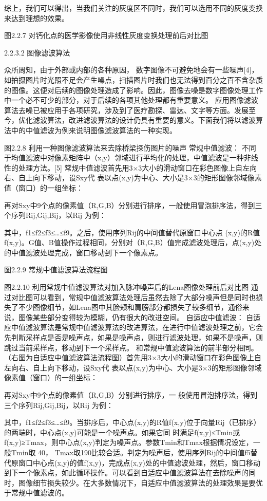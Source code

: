 	综上，我们可以得出，当我们关注的灰度区不同时，我们可以选用不同的灰度变换来达到理想的效果。

图2.2.7 对钙化点的医学影像使用非线性灰度变换处理前后对比图

2.2.3.2 图像滤波算法

众所周知，由于外部或内部的各种原因， 数字图像不可避免地会有一些噪声[4]，如拍摄图片时光照不足会产生噪点，扫描图片时我们也无法得到百分之百不含杂质的图像。这便对后续的图像处理造成了影响。因此，图像去噪是数字图像处理工作中一个必不可少的部分，对于后续的各项其他处理都有重要意义。 应用图像滤波算法去噪已被应用于各项研究，涉及到了医疗勘探、雷达、文字等方面。发展至今，优化滤波算法，改进滤波算法的设计仍具有重要的意义。下面我们将以滤波算法中的中值滤波为例来说明图像滤波算法的一种实现。

图2.2.8 利用一种图像滤波算法来去除桥梁探伤图片的噪声
常规中值滤波：
不同于均值滤波中对像素矩阵中（x,y）邻域进行平均化的处理，中值滤波是一种非线性的处理方法。[5]
	  常规中值滤波首先用3×3大小的滑动窗口在彩色图像上自左向右、自上向下移动，设Sxy代 表以点(x,y)为中心、大小是3×3的矩形图像邻域像素值（窗口）的一组坐标：

再对Sxy中9个点的像素值（R,G,B）分别进行排序，一般使用冒泡排序法，得到三个序列Rij,Gij,Bij，以Rij 为例：

其中，f1≤f2≤f3≤…≤f9。之后，使用序列Rij的中间值替代原窗口中心点 (x,y)的R值f(x,y)。G值、B值操作过程相同，分别对（R,G,B）值完成滤波处理后，点(x,y)处的中值滤波处理完成，窗口移动到下一个像素点。

图2.2.9 常规中值滤波算法流程图

图2.2.10 利用常规中值滤波算法对加入脉冲噪声后的Lena图像处理前后对比图
通过对比图可以看到，常规中值滤波算法处理后虽然去除了大部分噪声但是同时也损失了不少图像细节，如Lena图中其脸颊和肩膀部分都损失了较多细节，通俗来说，图像某些部分变得较为模糊，仍有很大的改进空间。
自适应中值滤波：
自适应中值滤波算法是常规中值滤波算法的改进算法，在进行中值滤波处理之前，它会先判断采样点是否是噪声点，如果是噪声点，则进行滤波处理，如果不是噪声，则跳过当前采样点，移动到下一个采样点。
	和常规中值滤波算法的前半部分相同。（右图为自适应中值滤波算法流程图）首先用3×3大小的滑动窗口在彩色图像上自左向右、自上向下移动，设Sxy代 表以点(x,y)为中心、大小是3×3的矩形图像邻域像素值（窗口）的一组坐标：

再对Sxy中9个点的像素值（R,G,B）分别进行排序，一 般使用冒泡排序法，得到三个序列Rij,Gij,Bij，以Rij 为例：

其中，f1≤f2≤f3≤…≤f9。当排序后，中心点(x,y)的R值f(x,y)位于向量Rij（已排序） 的两端时，中心点(x,y)可能是一个噪声点。如果它同 时满足f(x,y)≤Tmin或f(x,y)≥Tmax，则中心点(x,y)判定为噪声点。参数Tmin和Tmax根据情况设定，一般Tmin取 40， Tmax取190比较合适。判定为噪声后，使用序列Rij的中间值f5替代原窗口中心点(x,y)的值f(x,y)，完成点(x,y)处的中值滤波处理，然后，窗口移动到下一个像素点，如此循环操作。可以看到自适应中值滤波算法在去除噪声的同时，图像细节损失较少。在大多数情况下，自适应中值滤波算法的处理效果是要优于常规中值滤波的。

